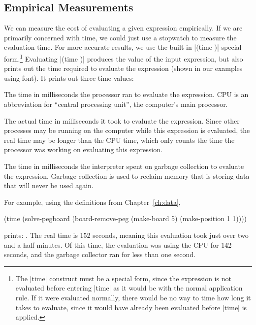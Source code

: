 \begin{schemeregion}
\section{Empirical Measurements}\label{sec:measuringcost}

We can measure the cost of evaluating a given expression empirically.  If we are primarily concerned with time, we could just use a stopwatch to measure the evaluation time.  For more accurate results, we use the built-in \scheme|(time \Expression)| special form.\footnote{The \scheme|time| construct must be a special form, since the expression is not evaluated before entering \scheme|time| as it would be with the normal application rule.  If it were evaluated normally, there would be no way to time how long it takes to evaluate, since it would have already been evaluated before \scheme|time| is applied.}  Evaluating \scheme|(time \Expression)| produces the value of the input expression, but also prints out the time required to evaluate the expression (shown in our examples using  font).  It prints out three time values:
\begin{descriptionlist}
\item [\soutput{cpu time}] \forcenl The time in milliseconds the processor ran to evaluate the expression.  CPU is an abbreviation for ``central processing unit'', the computer's main processor.
\item [\soutput{real time}] \forcenl The actual time in milliseconds it took to evaluate the expression.  Since other processes may be running on the computer while this expression is evaluated, the real time may be longer than the CPU time, which only counts the time the processor was working on evaluating this expression.
\item [\soutput{gc time}] \forcenl The time in milliseconds the interpreter spent on garbage collection to evaluate the expression.  Garbage collection is used to reclaim memory that is storing data that will never be used again.  
\end{descriptionlist}

For example, using the definitions from Chapter~\ref{ch:data}, 
\begin{schemedisplay}
(time (solve-pegboard (board-remove-peg (make-board 5) 
                                        (make-position 1 1))))
\end{schemedisplay}
prints: .  The real time is 152 seconds, meaning this evaluation took just over two and a half minutes.  Of this time, the evaluation was using the CPU for 142 seconds, and the garbage collector ran for less than one second.


\end{schemeregion}
